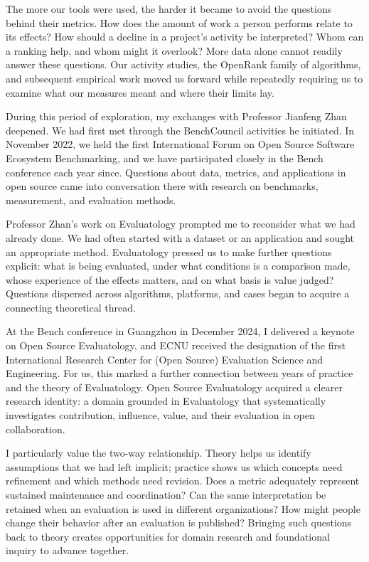 The more our tools were used, the harder it became to avoid the questions behind their metrics. How does the amount of work a person performs relate to its effects? How should a decline in a project's activity be interpreted? Whom can a ranking help, and whom might it overlook? More data alone cannot readily answer these questions. Our activity studies, the OpenRank family of algorithms, and subsequent empirical work moved us forward while repeatedly requiring us to examine what our measures meant and where their limits lay.

During this period of exploration, my exchanges with Professor Jianfeng Zhan deepened. We had first met through the BenchCouncil activities he initiated. In November 2022, we held the first International Forum on Open Source Software Ecosystem Benchmarking, and we have participated closely in the Bench conference each year since. Questions about data, metrics, and applications in open source came into conversation there with research on benchmarks, measurement, and evaluation methods.

Professor Zhan's work on Evaluatology prompted me to reconsider what we had already done. We had often started with a dataset or an application and sought an appropriate method. Evaluatology pressed us to make further questions explicit: what is being evaluated, under what conditions is a comparison made, whose experience of the effects matters, and on what basis is value judged? Questions dispersed across algorithms, platforms, and cases began to acquire a connecting theoretical thread.

At the Bench conference in Guangzhou in December 2024, I delivered a keynote on Open Source Evaluatology, and ECNU received the designation of the first International Research Center for (Open Source) Evaluation Science and Engineering. For us, this marked a further connection between years of practice and the theory of Evaluatology. Open Source Evaluatology acquired a clearer research identity: a domain grounded in Evaluatology that systematically investigates contribution, influence, value, and their evaluation in open collaboration.

I particularly value the two-way relationship. Theory helps us identify assumptions that we had left implicit; practice shows us which concepts need refinement and which methods need revision. Does a metric adequately represent sustained maintenance and coordination? Can the same interpretation be retained when an evaluation is used in different organizations? How might people change their behavior after an evaluation is published? Bringing such questions back to theory creates opportunities for domain research and foundational inquiry to advance together.

